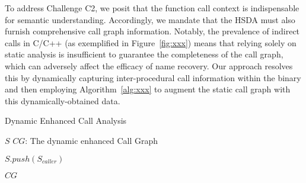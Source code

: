 \documentclass[acmsmall,screen,review,anonymous]{acmart} %
\begin{document}
To address Challenge C2, we posit that the function call context is indispensable for semantic understanding. Accordingly, we mandate that the HSDA must also furnish comprehensive call graph information. Notably, the prevalence of indirect calls in C/C++ (as exemplified in Figure~\ref{fig:xxx}) means that relying solely on static analysis is insufficient to guarantee the completeness of the call graph, which can adversely affect the efficacy of name recovery. Our approach resolves this by dynamically capturing inter-procedural call information within the binary and then employing Algorithm~\ref{alg:xxx} to augment the static call graph with this dynamically-obtained data.





\begin{algorithm}
  \caption{Dynamic Enhanced Call Analysis}
  \label{alg:CallAnalysis}
  \begin{algorithmic}[1]
    \REQUIRE $S$
    \ENSURE $CG$: The dynamic enhanced Call Graph

        \STATE $S.push(S_{caller})$
    \ENDFOR

    \ENDFOR
    \RETURN $CG$
  \end{algorithmic}
\end{algorithm}
\end{document}
